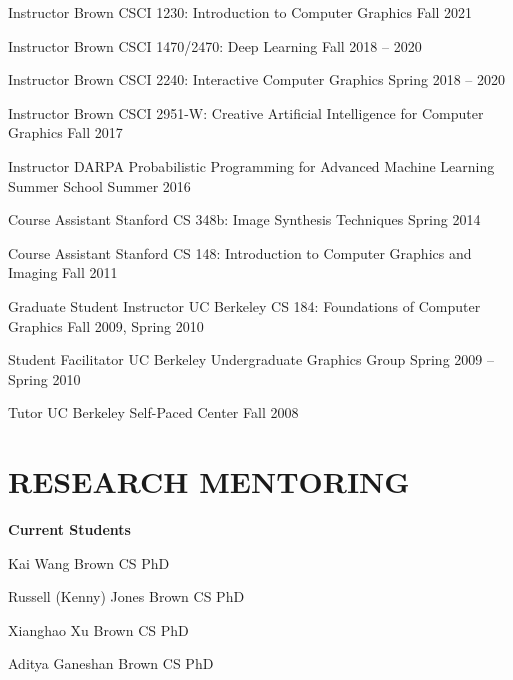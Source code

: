 \documentclass[line,margin]{res}
\begin{document}
\begin{resume}
\teach
{Instructor}
{Brown CSCI 1230: Introduction to Computer Graphics}
{Fall 2021}

\teach
{Instructor}
{Brown CSCI 1470/2470: Deep Learning}
{Fall 2018 -- 2020}

\teach
{Instructor}
{Brown CSCI 2240: Interactive Computer Graphics}
{Spring 2018 -- 2020}

\teach
{Instructor}
{Brown CSCI 2951-W: Creative Artificial Intelligence for Computer Graphics}
{Fall 2017}

\teach
{Instructor}
{DARPA Probabilistic Programming for Advanced Machine Learning Summer School}
{Summer 2016}

\teach
{Course Assistant}
{Stanford CS 348b: Image Synthesis Techniques}
{Spring 2014}

\teach
{Course Assistant}
{Stanford CS 148: Introduction to Computer Graphics and Imaging}
{Fall 2011}

\teach
{Graduate Student Instructor}
{UC Berkeley CS 184: Foundations of Computer Graphics}
{Fall 2009, Spring 2010}

\teach
{Student Facilitator}
{UC Berkeley Undergraduate Graphics Group}
{Spring 2009 -- Spring 2010}

\teach
{Tutor}
{UC Berkeley Self-Paced Center}
{Fall 2008}


\section{RESEARCH MENTORING}

\newcommand{\currentphd}[2] {
	#1 \hfill #2
}

\newcommand{\student}[3] {
	#1 \hfill #2 (expected #3)
}

\newcommand{\alumni}[4] {
	#1 \hfill #2 #3\\
	\emph{Next position: #4}
}

\newcommand{\visitor}[4] {
	#1 \hfill #2 #3\\
	\emph{Home institution: #4}
}


\textbf{Current Students}

\currentphd
{Kai Wang}
{Brown CS PhD}

\currentphd
{Russell (Kenny) Jones}
{Brown CS PhD}

\currentphd
{Xianghao Xu}
{Brown CS PhD}

\currentphd
{Aditya Ganeshan}
{Brown CS PhD}


\end{resume}
\end{document}
